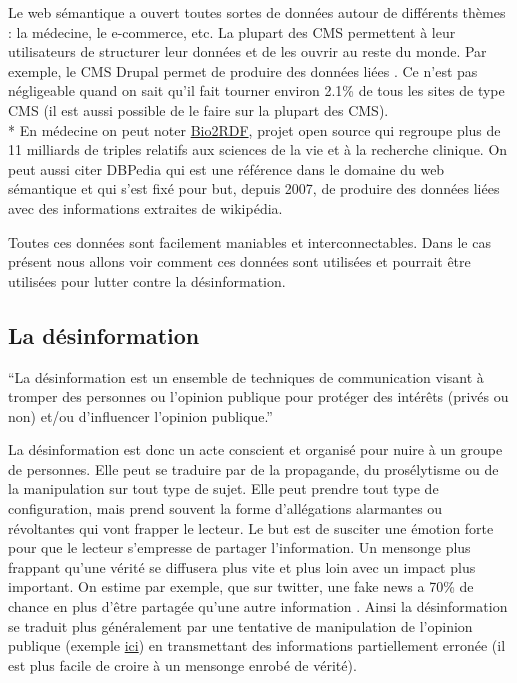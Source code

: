 Le web sémantique a ouvert toutes sortes de données autour de différents thèmes : la médecine, le e-commerce, etc. La plupart des CMS permettent à leur utilisateurs de structurer leur données et de les ouvrir au reste du monde. Par exemple, le CMS Drupal permet de produire des données liées \cite{corlosquet2009produce}. Ce n'est pas négligeable quand on sait qu'il fait tourner environ 2.1\% de tous les sites de type CMS \cite{w3techs} (il est aussi possible de le faire sur la plupart des CMS). 
\\*
En médecine on peut noter \href{http://bio2rdf.org/}{Bio2RDF}, projet open source qui regroupe plus de 11 milliards de triples relatifs aux sciences de la vie et à la recherche clinique. On peut aussi citer DBPedia qui est une référence dans le domaine du web sémantique et qui s'est fixé pour but, depuis 2007, de produire des données liées avec des informations extraites de wikipédia.

Toutes ces données sont facilement maniables et interconnectables. Dans le cas présent nous allons voir comment ces données sont utilisées et pourrait être utilisées pour lutter contre la désinformation.


\subsection{La désinformation}

\enquote{La désinformation est un ensemble de techniques de communication visant à tromper des personnes ou l'opinion publique pour protéger des intérêts (privés ou non) et/ou d'influencer l'opinion publique.} \cite{wiki:desinformation}

La désinformation est donc un acte conscient et organisé pour nuire à un groupe de personnes. Elle peut se traduire par de la propagande, du prosélytisme ou de la manipulation sur tout type de sujet. Elle peut prendre tout type de configuration, mais prend souvent la forme d'allégations alarmantes ou révoltantes qui vont frapper le lecteur. Le but est de susciter une émotion forte pour que le lecteur s'empresse de partager l'information. Un mensonge plus frappant qu'une vérité se diffusera plus vite et plus loin avec un impact plus important. On estime par exemple, que sur twitter, une fake news a 70\% de chance en plus d'être partagée qu'une autre information \cite{vosoughi2017rumor}. 
Ainsi la désinformation se traduit plus généralement par une tentative de manipulation de l'opinion publique (exemple \href{https://www.20minutes.fr/societe/2261439-20180426-video-evacuation-tolbiac-retour-naissance-fake-news}{ici}) en transmettant des informations partiellement erronée (il est plus facile de croire à un mensonge enrobé de vérité). 

